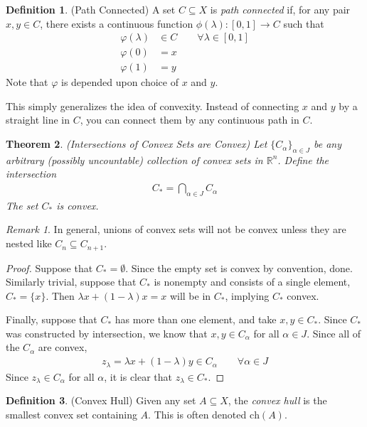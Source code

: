 \documentclass[12pt]{book}
\numberwithin{equation}{section} %
\theoremstyle{plain}
\newtheorem{thm}{Theorem}[section]
\theoremstyle{definition}
\newtheorem{defn}[thm]{Definition}
\theoremstyle{remark}
\newtheorem*{rmk}{Remark}
\newcommand{\ch}{\text{ch}}
\newcommand{\Rn}{\mathbb{R}^n}
\begin{document}
\begin{defn}{(Path Connected)}
A set $C\subseteq X$ is \emph{path connected} if, for any pair $x,y\in
C$, there exists a continuous function $\phi(\lambda):[0,1]\rightarrow
C$ such that
\begin{align*}
  \varphi(\lambda) &\in C \qquad \forall \lambda \in [0,1]\\
  \varphi(0) &= x\\
  \varphi(1) &= y
\end{align*}
Note that $\varphi$ is depended upon choice of $x$ and $y$.

This simply generalizes the idea of convexity. Instead of connecting $x$
and $y$ by a straight line in $C$, you can connect them by any
continuous path in $C$.
\end{defn}

\begin{thm}{\emph{(Intersections of Convex Sets are Convex)}}
Let $\{C_\alpha\}_{\alpha \in J}$ be any arbitrary (possibly
uncountable) collection of convex sets in $\Rn$. Define the intersection
\begin{align*}
  C_* = \bigcap_{\alpha \in J} C_\alpha
\end{align*}
The set $C_*$ is convex.
\end{thm}
\begin{rmk}
In general, unions of convex sets will not be convex unless they are
nested like $C_n \subseteq C_{n+1}$.
\end{rmk}

\begin{proof}
Suppose that $C_* = \emptyset$. Since the empty set is convex by
convention, done. Similarly trivial, suppose that $C_*$ is nonempty and
consists of a single element, $C_* = \{x\}$. Then $\lambda x +
(1-\lambda) x = x$ will be in $C_*$, implying $C_*$ convex.

Finally, suppose that $C_*$ has more than one element, and take $x,y\in
C_*$. Since $C_*$ was constructed by intersection, we know that
$x,y\in C_\alpha$ for all $\alpha \in J$. Since all of the $C_\alpha$
are convex,
\begin{align*}
  z_\lambda = \lambda x + (1-\lambda)y \in C_\alpha
  \qquad \forall \alpha \in J
\end{align*}
Since $z_\lambda \in C_\alpha$ for all $\alpha$, it is clear that
$z_\lambda \in C_*$.
\end{proof}

\begin{defn}{(Convex Hull)}
Given any set $A\subseteq X$, the \emph{convex hull} is the smallest
convex set containing $A$. This is often denoted $\ch(A)$.
\end{defn}
\end{document}
